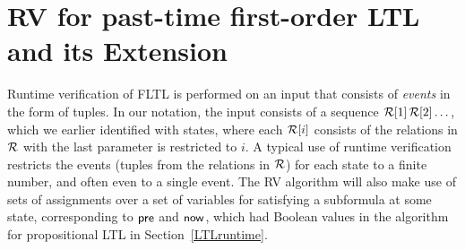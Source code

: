 
\section{RV for past-time
first-order  LTL and its Extension}
\label{EPLTLRV}

Runtime verification of FLTL is performed on an
input that consists of {\em events} in the form of
tuples. In our notation, the input
consists of a sequence ${\cal R}[1] \, {\cal R}[2]  \ldots$,
which we earlier identified with states, where each
${\cal R}[i]$ consists of the relations in
${\cal R}$ with
the last parameter is restricted to  $i$. A typical use
of runtime verification restricts the
events (tuples from the relations in ${\cal R}$) for
each state to a finite number, and often even to a single event.
The RV algorithm will also make
use of sets of assignments over a set of variables for satisfying a subformula at
some state, corresponding to $\mathsf{pre}$ and $\mathsf{now}$, which had Boolean values in the 
algorithm for propositional LTL in Section~\ref{LTLruntime}.



